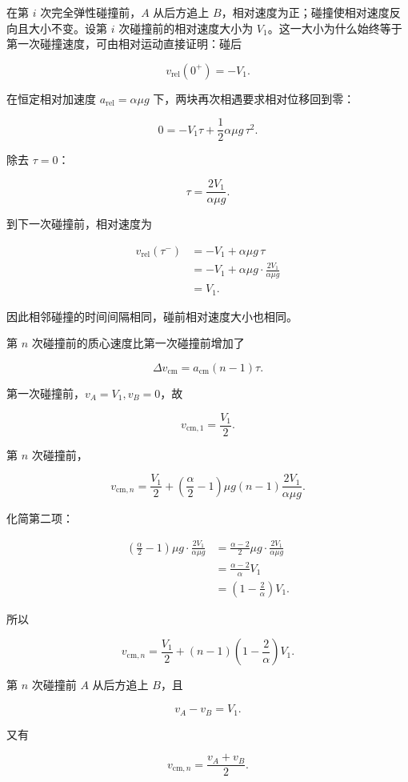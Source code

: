 \documentclass[12pt,a4paper,UTF8]{ctexart}
\begin{document}
在第 \(i\) 次完全弹性碰撞前，\(A\) 从后方追上
\(B\)，相对速度为正；碰撞使相对速度反向且大小不变。设第 \(i\)
次碰撞前的相对速度大小为
\(V_1\)。这一大小为什么始终等于第一次碰撞速度，可由相对运动直接证明：碰后

\[v_{\mathrm{rel}}(0^+)=-V_1.\]

在恒定相对加速度 \(a_{\mathrm{rel}}=\alpha\mu g\)
下，两块再次相遇要求相对位移回到零：

\[0=-V_1\tau+\frac12\alpha\mu g\,\tau^2.\]

除去 \(\tau=0\)：

\[\boxed{\tau=\frac{2V_1}{\alpha\mu g}}.\]

到下一次碰撞前，相对速度为

\[\begin{aligned}
v_{\mathrm{rel}}(\tau^-)
&=-V_1+\alpha\mu g\,\tau\\
&=-V_1+\alpha\mu g
\cdot\frac{2V_1}{\alpha\mu g}\\
&=V_1.
\end{aligned}\]

因此相邻碰撞的时间间隔相同，碰前相对速度大小也相同。

第 \(n\) 次碰撞前的质心速度比第一次碰撞前增加了

\[\Delta v_{\mathrm{cm}}=a_{\mathrm{cm}}(n-1)\tau.\]

第一次碰撞前，\(v_A=V_1,v_B=0\)，故

\[v_{\mathrm{cm},1}=\frac{V_1}{2}.\]

第 \(n\) 次碰撞前，

\[v_{\mathrm{cm},n}
=\frac{V_1}{2}
+\left(\frac{\alpha}{2}-1\right)\mu g
(n-1)\frac{2V_1}{\alpha\mu g}.\]

化简第二项：

\[\begin{aligned}
\left(\frac{\alpha}{2}-1\right)\mu g
\cdot\frac{2V_1}{\alpha\mu g}
&=\frac{\alpha-2}{2}\mu g
\cdot\frac{2V_1}{\alpha\mu g}\\
&=\frac{\alpha-2}{\alpha}V_1\\
&=\left(1-\frac2\alpha\right)V_1.
\end{aligned}\]

所以

\[v_{\mathrm{cm},n}
=\frac{V_1}{2}
+(n-1)\left(1-\frac2\alpha\right)V_1.\]

第 \(n\) 次碰撞前 \(A\) 从后方追上 \(B\)，且

\[v_A-v_B=V_1.\]

又有

\[v_{\mathrm{cm},n}=\frac{v_A+v_B}{2}.\]
\end{document}
